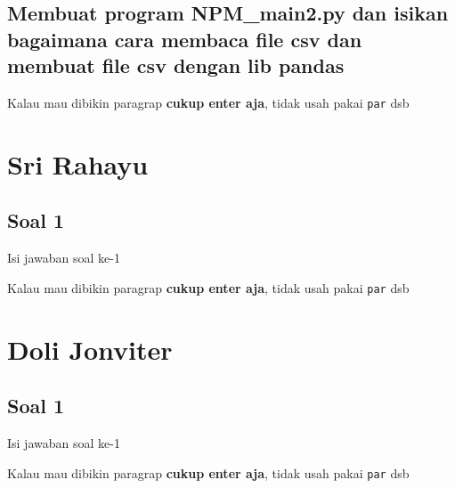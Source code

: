 \subsection{Membuat program NPM\_main2.py dan isikan bagaimana cara membaca file csv dan membuat file csv dengan lib pandas}

	
Kalau mau dibikin paragrap \textbf{cukup enter aja}, tidak usah pakai \verb|par| dsb



\section{Sri Rahayu}
\subsection{Soal 1}
Isi jawaban soal ke-1

Kalau mau dibikin paragrap \textbf{cukup enter aja}, tidak usah pakai \verb|par| dsb



\section{Doli Jonviter}
\subsection{Soal 1}
Isi jawaban soal ke-1

Kalau mau dibikin paragrap \textbf{cukup enter aja}, tidak usah pakai \verb|par| dsb

